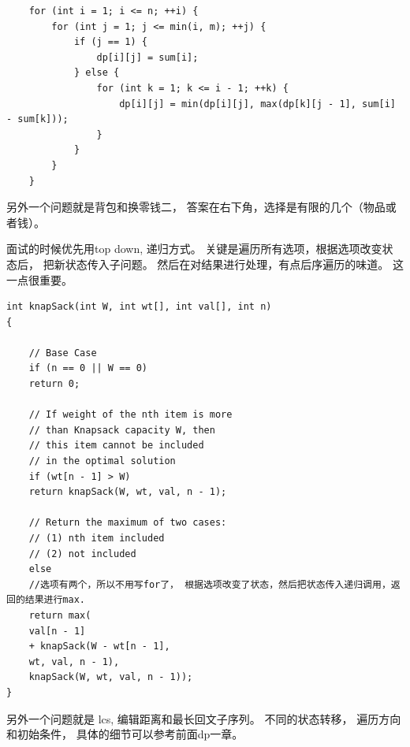 \documentclass[a4paper,11pt,twoside]{book}
\begin{document}
\begin{itemize}
\begin{lstlisting}
	for (int i = 1; i <= n; ++i) {
		for (int j = 1; j <= min(i, m); ++j) {
			if (j == 1) {
				dp[i][j] = sum[i];
			} else {
				for (int k = 1; k <= i - 1; ++k) {
					dp[i][j] = min(dp[i][j], max(dp[k][j - 1], sum[i] - sum[k]));
				}
			}
		}
	}
\end{lstlisting}

另外一个问题就是背包和换零钱二， 答案在右下角，选择是有限的几个（物品或者钱）。

面试的时候优先用top down, 递归方式。 关键是遍历所有选项，根据选项改变状态后， 把新状态传入子问题。 然后在对结果进行处理，有点后序遍历的味道。 这一点很重要。
\begin{lstlisting}
int knapSack(int W, int wt[], int val[], int n)
{
	
	// Base Case
	if (n == 0 || W == 0)
	return 0;
	
	// If weight of the nth item is more
	// than Knapsack capacity W, then
	// this item cannot be included
	// in the optimal solution
	if (wt[n - 1] > W)
	return knapSack(W, wt, val, n - 1);
	
	// Return the maximum of two cases:
	// (1) nth item included
	// (2) not included
	else
	//选项有两个，所以不用写for了， 根据选项改变了状态，然后把状态传入递归调用，返回的结果进行max. 
	return max(
	val[n - 1]
	+ knapSack(W - wt[n - 1], 
	wt, val, n - 1),
	knapSack(W, wt, val, n - 1));
}	
\end{lstlisting}

另外一个问题就是 lcs, 编辑距离和最长回文子序列。 不同的状态转移， 遍历方向和初始条件， 具体的细节可以参考前面dp一章。 


		
\end{itemize}
\end{document}
